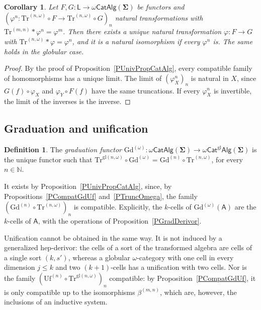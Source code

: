\documentclass[a4paper,reqno]{amsart}
\newcommand{\sig}[1]{\mathbf{#1}}                %
\newcommand{\calg}[1]{\boldsymbol{\mathsf{#1}}}  %
\newcommand{\gl}{\mathrm{gl}}
\newcommand{\Gd}{\mathrm{Gd}}
\newcommand{\Uf}{\mathrm{Uf}}
\newcommand{\Tr}{\mathrm{Tr}}
\newcommand{\mor}{\to}
\theoremstyle{plain}
\newtheorem{corollary}[theorem]{Corollary}
\theoremstyle{definition}
\newtheorem{definition}[theorem]{Definition}
\begin{document}
\begin{corollary}\label{CLimitNat}
Let $F,G\colon\mathsf{L}\mor\omega\mathsf{CatAlg}(\sig{\Sigma})$ be functors and $(\varphi^{n}\colon\Tr^{(n,\omega)}\circ F\mor\Tr^{(n,\omega)}\circ G)_{n}$ natural transformations with $\Tr^{(m,n)}\ast\varphi^{n}=\varphi^{m}$.
Then there exists a unique natural transformation $\varphi\colon F\mor G$ with $\Tr^{(n,\omega)}\ast\varphi=\varphi^{n}$, and it is a natural isomorphism if every $\varphi^{n}$ is.
The same holds in the globular case.
\end{corollary}
\begin{proof}
By the proof of Proposition~\ref{PUnivPropCatAlg}, every compatible family of homomorphisms has a unique limit.
The limit of $(\varphi^{n}_{X})_{n}$ is natural in $X$, since $G(f)\circ\varphi_{X}$ and $\varphi_{Y}\circ F(f)$ have the same truncations.
If every $\varphi^{n}_{X}$ is invertible, the limit of the inverses is the inverse.
\end{proof}

\subsection{Graduation and unification}

\begin{definition}\label{DGdOmega}
The \emph{graduation functor} $\Gd^{(\omega)}\colon\omega\mathsf{CatAlg}(\sig{\Sigma})\mor\omega\mathsf{Cat}^{\gl}\mathsf{Alg}(\sig{\Sigma})$ is the unique functor such that $\Tr^{\gl(n,\omega)}\circ\Gd^{(\omega)}=\Gd^{(n)}\circ\Tr^{(n,\omega)}$, for every $n\in\mathbb{N}$.
\end{definition}

It exists by Proposition~\ref{PUnivPropCatAlg}, since, by Propositions~\ref{PCompatGdUf} and~\ref{PTruncOmega}, the family $(\Gd^{(n)}\circ\Tr^{(n,\omega)})_{n}$ is compatible.
Explicitly, the $k$-cells of $\Gd^{(\omega)}(\calg{A})$ are the $k$-cells of $\calg{A}$, with the operations of Proposition~\ref{PGradDerivor}.

Unification cannot be obtained in the same way.
It is not induced by a generalized hep-derivor: the cells of a sort of the transformed algebra are cells of a single sort $(k,s')$, whereas a globular $\omega$-category with one cell in every dimension $j\leq k$ and two $(k+1)$-cells has a unification with two cells.
Nor is the family $(\Uf^{(n)}\circ\Tr^{\gl(n,\omega)})_{n}$ compatible: by Proposition~\ref{PCompatGdUf}, it is only compatible up to the isomorphisms $\beta^{(m,n)}$, which are, however, the inclusions of an inductive system.
\end{document}
